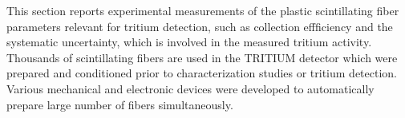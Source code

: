 This section reports experimental measurements of the plastic scintillating fiber parameters relevant for tritium detection, such as collection effficiency and the systematic uncertainty, which is involved in the measured tritium activity. Thousands of scintillating fibers are used in the TRITIUM detector which were prepared and conditioned prior to characterization studies or tritium detection. Various mechanical and electronic devices were developed to automatically prepare large number of fibers simultaneously.